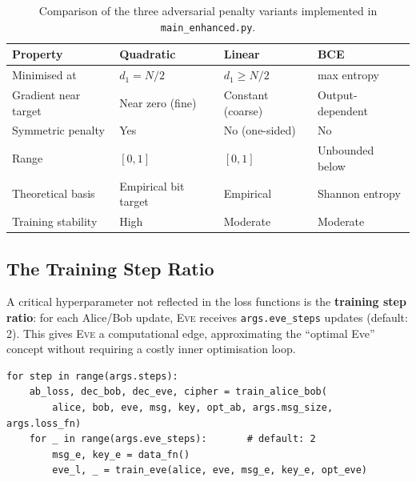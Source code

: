 \documentclass[12pt, a4paper]{article}
\newcommand{\eve}{\textsc{Eve}}
\newcommand{\code}[1]{\texttt{\color{CodeRed}#1}}
\begin{document}
\begin{table}[H]
  \centering
  \caption{Comparison of the three adversarial penalty variants
           implemented in \code{main\_enhanced.py}.}
  \label{tab:loss_comparison}
  \renewcommand{\arraystretch}{1.4}
  \begin{tabularx}{\linewidth}{@{} l X X X @{}}
    \toprule
    \textbf{Property} & \textbf{Quadratic} & \textbf{Linear} &
    \textbf{BCE} \\
    \midrule
    Minimised at        & $d_1 = N/2$     & $d_1 \geq N/2$  & max entropy \\
    Gradient near target & Near zero (fine) & Constant (coarse) & Output-dependent \\
    Symmetric penalty   & Yes             & No (one-sided)  & No \\
    Range               & $[0,1]$         & $[0,1]$         & Unbounded below \\
    Theoretical basis   & Empirical bit target & Empirical  & Shannon entropy \\
    Training stability  & High            & Moderate        & Moderate \\
    \bottomrule
  \end{tabularx}
\end{table}

\subsection{The Training Step Ratio}
\label{subsec:step_ratio}

A critical hyperparameter not reflected in the loss functions is the
\textbf{training step ratio}: for each Alice/Bob update, \eve{} receives
\code{args.eve\_steps} updates (default: 2). This gives \eve{} a
computational edge, approximating the ``optimal Eve'' concept without
requiring a costly inner optimisation loop.

\begin{lstlisting}[caption={Configurable training step ratio in the main loop}]
for step in range(args.steps):
    ab_loss, dec_bob, dec_eve, cipher = train_alice_bob(
        alice, bob, eve, msg, key, opt_ab, args.msg_size, args.loss_fn)
    for _ in range(args.eve_steps):       # default: 2
        msg_e, key_e = data_fn()
        eve_l, _ = train_eve(alice, eve, msg_e, key_e, opt_eve)
\end{lstlisting}
\end{document}

